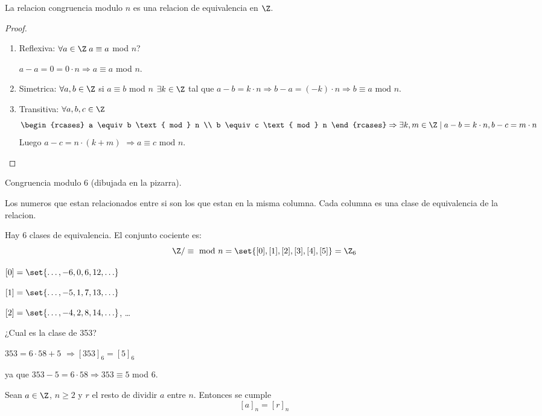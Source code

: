 \begin{proposition}
	La relacion congruencia modulo \(n \) es una relacion de equivalencia en \(\Z \).
\end{proposition}
\begin{proof}
	~\begin{enumerate}
		\item Reflexiva: \(\forall  a \in \Z \; a \equiv a \) mod \(n \)?

		      \(a - a = 0 = 0 \cdot n \Rightarrow a \equiv a \) mod \(n \).
		\item Simetrica: \(\forall a,b \in \Z \) si \(a \equiv b \) mod \(n \) \(\exists k \in \Z \) tal que \(a - b = k \cdot n \Rightarrow b - a = (-k) \cdot n \Rightarrow b \equiv a \text{ mod } n \).
		\item Transitiva: \(\forall a,b,c \in \Z \)
		      \[
			      \begin{rcases}
				      a \equiv b \text{ mod } n \\
				      b \equiv c \text{ mod } n
			      \end{rcases} \Rightarrow \exists k, m \in \Z \mid a - b = k \cdot n, b - c = m \cdot n
		      \]
		      Luego \(a - c = n \cdot (k + m )\) \(\Rightarrow a \equiv c \text{ mod } n \).
	\end{enumerate}
\end{proof}
\begin{example}
	Congruencia modulo 6 (dibujada en la pizarra).

	Los numeros que estan relacionados entre si son los que estan en la misma columna. Cada columna es una clase de equivalencia de la relacion.

	Hay 6 clases de equivalencia. El conjunto cociente es:
	\[
		\Z / \equiv \text{ mod } n = \set{[0],[1],[2],[3],[4],[5]} = \Z_6
	\]

	\([0] = \set{\ldots, -6, 0, 6, 12, \ldots }\)

	\([1] = \set{\ldots,-5,1,7,13,\ldots }\)

	\([2] = \set{\ldots,-4,2,8,14,\ldots }\), \dots
\end{example}
\begin{example}
	¿Cual es la clase de 353?

	\(353 = 6 \cdot 58 + 5 \) \(\Rightarrow [353]_6 = [5]_6\)

	ya que \(353 - 5 = 6 \cdot 58 \Rightarrow 353 \equiv 5 \) mod \(6 \).
\end{example}

\begin{proposition}
	Sean \(a \in \Z \), \(n \geq 2 \) y \(r \) el resto de dividir \(a \) entre \(n \). Entonces se cumple
	\[
		[a]_n = [r]_n
	\]
\end{proposition}


